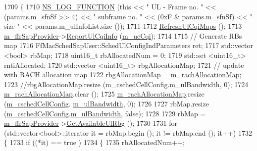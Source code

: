 \begin{DoxyCode}
1709 \{
1710   \hyperlink{log-macros-disabled_8h_a90b90d5bad1f39cb1b64923ea94c0761}{NS\_LOG\_FUNCTION} (\textcolor{keyword}{this} << \textcolor{stringliteral}{" UL - Frame no. "} << (params.m\_sfnSf >> 4) << \textcolor{stringliteral}{" subframe no. "} 
      << (0xF & params.m\_sfnSf) << \textcolor{stringliteral}{" size "} << params.m\_ulInfoList.size ());
1711 
1712   \hyperlink{classns3_1_1FdTbfqFfMacScheduler_ad2dfae20e850223f711180ab3a900cfd}{RefreshUlCqiMaps} ();
1713   \hyperlink{classns3_1_1FdTbfqFfMacScheduler_a15bcdfbb46c65cae0d42e26b321f7827}{m\_ffrSapProvider}->\hyperlink{classns3_1_1LteFfrSapProvider_a14e6bcaf7db6afcb42f75122717313b1}{ReportUlCqiInfo} (\hyperlink{classns3_1_1FdTbfqFfMacScheduler_a74c33465af3fd4306d994e9942836a27}{m\_ueCqi});
1714 
1715   \textcolor{comment}{// Generate RBs map}
1716   FfMacSchedSapUser::SchedUlConfigIndParameters ret;
1717   std::vector <bool> rbMap;
1718   uint16\_t rbAllocatedNum = 0;
1719   std::set <uint16\_t> rntiAllocated;
1720   std::vector <uint16\_t> rbgAllocationMap;
1721   \textcolor{comment}{// update with RACH allocation map}
1722   rbgAllocationMap = \hyperlink{classns3_1_1FdTbfqFfMacScheduler_a046aaad84777461862179b30893e38ec}{m\_rachAllocationMap};
1723   \textcolor{comment}{//rbgAllocationMap.resize (m\_cschedCellConfig.m\_ulBandwidth, 0);}
1724   \hyperlink{classns3_1_1FdTbfqFfMacScheduler_a046aaad84777461862179b30893e38ec}{m\_rachAllocationMap}.clear ();
1725   \hyperlink{classns3_1_1FdTbfqFfMacScheduler_a046aaad84777461862179b30893e38ec}{m\_rachAllocationMap}.resize (\hyperlink{classns3_1_1FdTbfqFfMacScheduler_a73d5d866713fa06e1cc6186b0f556693}{m\_cschedCellConfig}.
      \hyperlink{structns3_1_1FfMacCschedSapProvider_1_1CschedCellConfigReqParameters_a5ab5b102878e6e7e7727a14af4a64d2f}{m\_ulBandwidth}, 0);
1726 
1727   rbMap.resize (\hyperlink{classns3_1_1FdTbfqFfMacScheduler_a73d5d866713fa06e1cc6186b0f556693}{m\_cschedCellConfig}.\hyperlink{structns3_1_1FfMacCschedSapProvider_1_1CschedCellConfigReqParameters_a5ab5b102878e6e7e7727a14af4a64d2f}{m\_ulBandwidth}, \textcolor{keyword}{false});
1728 
1729   rbMap = \hyperlink{classns3_1_1FdTbfqFfMacScheduler_a15bcdfbb46c65cae0d42e26b321f7827}{m\_ffrSapProvider}->\hyperlink{classns3_1_1LteFfrSapProvider_aafd23b22a27ec83e03d54795c122d175}{GetAvailableUlRbg} ();
1730 
1731   \textcolor{keywordflow}{for} (std::vector<bool>::iterator it = rbMap.begin (); it != rbMap.end (); it++)
1732     \{
1733       \textcolor{keywordflow}{if} ((*it) == true )
1734         \{
1735           rbAllocatedNum++;

\end{DoxyCode}
